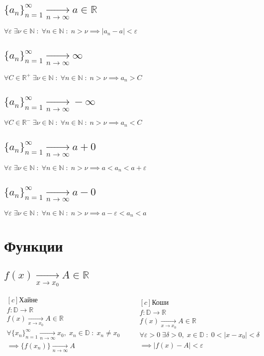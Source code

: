 \documentclass[12pt]{article}
\newcommand{\pto}[2]{\xrightarrow[#1 \to #2]{}}
\newcommand{\xto}[1]{\pto{x}{#1}}
\newcommand{\nto}{\pto{n}{\infty}}
\newcommand{\N}{\mathbb{N}}
\newcommand{\R}{\mathbb{R}}
\newcommand{\D}{\mathbb{D}}
\newcommand{\spc}{\quad}
\newcommand{\e}{\varepsilon}
\newcommand{\seq}[1]{\{#1_n\}_{n=1}^{\infty}}
\begin{document}
\subsection*{\(\seq{a} \nto a \in \R\)}
\(\forall \e \; \exists\nu \in \N \; : \; \forall n \in  \N \; : \; n > \nu \implies |a_n - a| < \e\)

\subsection*{\(\seq{a} \nto \infty\)}
\(\forall C \in \R^+ \; \exists\nu \in \N \; : \; \forall n \in  \N \; : \; n > \nu \implies a_n > C\)

\subsection*{\(\seq{a} \nto -\infty\)}
\(\forall C \in \R^- \; \exists\nu \in \N \; : \; \forall n \in  \N \; : \; n > \nu \implies a_n < C\)

\subsection*{\(\seq{a} \nto a + 0\)}
\(\forall \e \; \exists\nu \in \N \; : \; \forall n \in  \N \; : \; n > \nu \implies a < a_n < a + \e\)

\subsection*{\(\seq{a} \nto a - 0\)}
\(\forall \e \; \exists\nu \in \N \; : \; \forall n \in  \N \; : \; n > \nu \implies a - \e < a_n < a\)

\section*{Функции}

\subsection*{\(f(x) \xto{x_0} A \in \R\)}
\(\begin{aligned}[c]
    \text{Хайне}\\
    f: \D \to \R\\
    f(x) \xto{x_0} A \in \R\\
    \forall \seq{x} \nto x_0, \; x_n \in \D \; : \; x_n \neq x_0\\
    \implies \{f(x_n)\} \nto A 
\end{aligned}
\spc\spc
\begin{aligned}[c]
    \text{Коши}\\
    f: \D \to \R\\
    f(x) \xto{x_0} A \in \R\\
    \forall \e > 0 \; \exists \delta > 0, \; x \in \D \; : \; 0 < |x - x_0| < \delta\\
    \implies |f(x) - A| < \e
\end{aligned}\)
\end{document}
